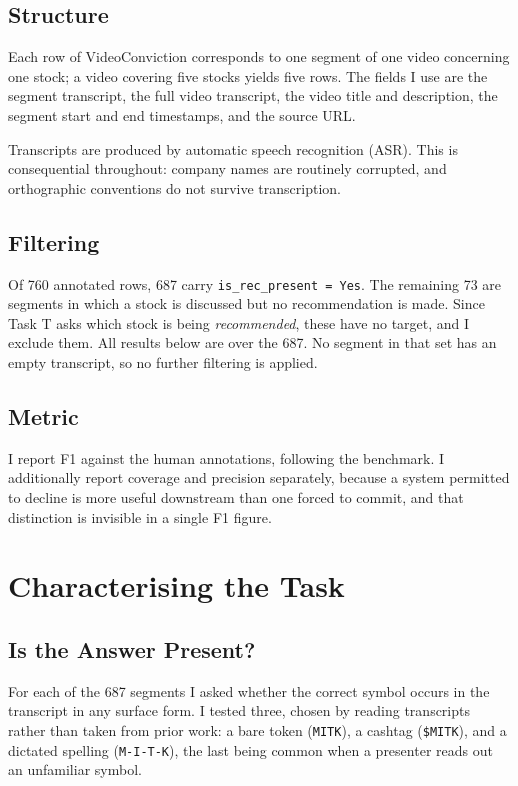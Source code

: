 \documentclass[conference]{IEEEtran}
\begin{document}
\subsection{Structure}

Each row of VideoConviction corresponds to one segment of one video concerning
one stock; a video covering five stocks yields five rows. The fields I use are
the segment transcript, the full video transcript, the video title and
description, the segment start and end timestamps, and the source URL.

Transcripts are produced by automatic speech recognition (ASR). This is
consequential throughout: company names are routinely corrupted, and
orthographic conventions do not survive transcription.

\subsection{Filtering}

Of 760 annotated rows, 687 carry \texttt{is\_rec\_present = Yes}. The remaining
73 are segments in which a stock is discussed but no recommendation is made.
Since Task T asks which stock is being \emph{recommended}, these have no target,
and I exclude them. All results below are over the 687. No segment in that set
has an empty transcript, so no further filtering is applied.

\subsection{Metric}

I report F1 against the human annotations, following the benchmark. I
additionally report coverage and precision separately, because a system
permitted to decline is more useful downstream than one forced to commit, and
that distinction is invisible in a single F1 figure.

\section{Characterising the Task}
\label{sec:char}

\subsection{Is the Answer Present?}

For each of the 687 segments I asked whether the correct symbol occurs in the
transcript in any surface form. I tested three, chosen by reading transcripts
rather than taken from prior work: a bare token (\texttt{MITK}), a cashtag
(\texttt{\$MITK}), and a dictated spelling (\texttt{M-I-T-K}), the last being
common when a presenter reads out an unfamiliar symbol.
\end{document}
